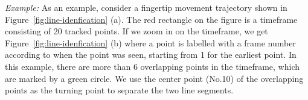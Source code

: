         \noindent \emph{Example:} As an example, consider a fingertip movement trajectory shown in
        Figure~\ref{fig:line-idenfication} (a). The red rectangle on the
        figure is a timeframe consisting of 20 tracked points.  If we zoom in
        on the timeframe, we get Figure~\ref{fig:line-idenfication} (b) where
        a point is labelled with a frame number according to when
        the point was seen, starting from 1 for the earliest point. In this example, there are more than 6
        overlapping points in the timeframe, which are marked by a green
        circle. We use the center
        point (No.10) of the overlapping points as the turning point to separate the two line segments.

        \begin{figure}[!t]
            \centering
\end{figure}
